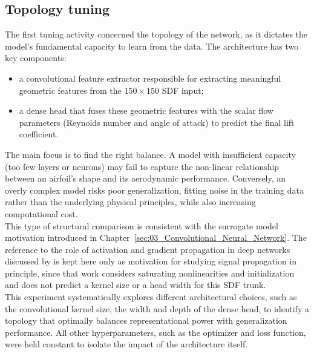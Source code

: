 \subsection{Topology tuning}
\label{sec:04_topology_tuning}

The first tuning activity concerned the topology of the network, as it dictates the model's fundamental capacity to learn from the data. The architecture has two key components:
\begin{itemize}
    \item[-] a convolutional feature extractor responsible for extracting meaningful geometric features from the $150\times150$ SDF input;
    \item[-] a dense head that fuses these geometric features with the scalar flow parameters (Reynolds number and angle of attack) to predict the final lift coefficient.
\end{itemize}
The main focus is to find the right balance. A model with insufficient capacity (too few layers or neurons) may fail to capture the non-linear relationship between an airfoil's shape and its aerodynamic performance. Conversely, an overly complex model risks poor generalization, fitting noise in the training data rather than the underlying physical principles, while also increasing computational cost.\\

This type of structural comparison is consistent with the surrogate model motivation introduced in Chapter~\ref{sec:03_Convolutional_Neural_Network}. The reference to the role of activation and gradient propagation in deep networks discussed by \cite{glorot2010understanding} is kept here only as motivation for studying signal propagation in principle, since that work considers saturating nonlinearities and initialization and does not predict a kernel size or a head width for this SDF trunk.\\

This experiment systematically explores different architectural choices, such as the convolutional kernel size, the width and depth of the dense head, to identify a topology that optimally balances representational power with generalization performance. All other hyperparameters, such as the optimizer and loss function, were held constant to isolate the impact of the architecture itself.\\

